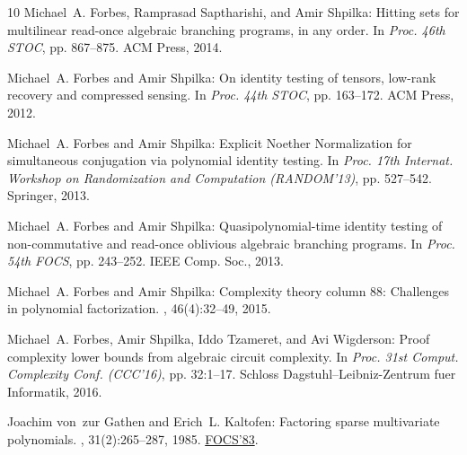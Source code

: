 \documentclass[11pt]{article}
\numberwithin{equation}{section}
\theoremstyle{definition}
\theoremstyle{plain}
\begin{document}
\begin{thebibliography}{10}
{\sc Michael~A. Forbes, Ramprasad Saptharishi, and Amir Shpilka}: Hitting sets
  for multilinear read-once algebraic branching programs, in any order.
\newblock In {\em Proc. 46th STOC}, pp. 867--875. ACM Press, 2014.

{\sc Michael~A. Forbes and Amir Shpilka}: On identity testing of tensors,
  low-rank recovery and compressed sensing.
\newblock In {\em Proc. 44th STOC}, pp. 163--172. ACM Press, 2012.

{\sc Michael~A. Forbes and Amir Shpilka}: Explicit {N}oether {N}ormalization
  for simultaneous conjugation via polynomial identity testing.
\newblock In {\em Proc. 17th Internat. Workshop on Randomization and
  Computation (RANDOM'13)}, pp. 527--542. Springer, 2013.

{\sc Michael~A. Forbes and Amir Shpilka}: Quasipolynomial-time identity testing
  of non-commutative and read-once oblivious algebraic branching programs.
\newblock In {\em Proc. 54th FOCS}, pp. 243--252. IEEE Comp. Soc., 2013.

{\sc Michael~A. Forbes and Amir Shpilka}: Complexity theory column 88:
  Challenges in polynomial factorization.
, 46(4):32--49, 2015.
\newblock [\epfmtdoi{10.1145/2852040.2852051}]

{\sc Michael~A. Forbes, Amir Shpilka, Iddo Tzameret, and Avi Wigderson}: Proof
  complexity lower bounds from algebraic circuit complexity.
\newblock In {\em Proc. 31st Comput. Complexity Conf. (CCC'16)}, pp. 32:1--17.
  Schloss Dagstuhl--Leibniz-Zentrum fuer Informatik, 2016.

{\sc Joachim von~zur Gathen and Erich~L. Kaltofen}: Factoring sparse
  multivariate polynomials.
, 31(2):265--287, 1985.
\newblock \prelim \href{https://doi.org/10.1109/SFCS.1983.15}{FOCS'83}.
\newblock [\epfmtdoi{10.1016/0022-0000(85)90044-3}]


\end{thebibliography}
\end{document}
